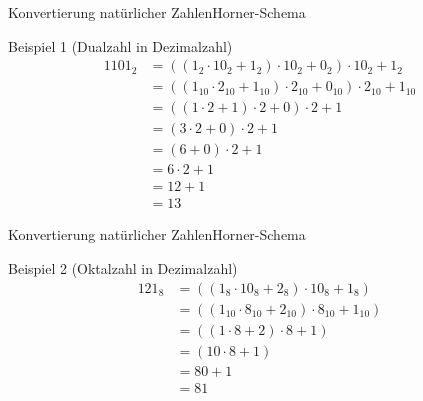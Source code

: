 \documentclass[xelatex,aspectratio=169]{beamer}
\begin{document}
\begin{frame}{Konvertierung natürlicher Zahlen}{Horner-Schema}
  \begin{exampleblock}{Beispiel 1 (Dualzahl in Dezimalzahl)}
    \begin{align*}
      1101_2 & = ((1_2 \cdot 10_2 + 1_2) \cdot 10_2 + 0_2) \cdot 10_2 + 1_2                   \\
             & = ((1_{10} \cdot 2_{10} + 1_{10}) \cdot 2_{10} + 0_{10}) \cdot 2_{10} + 1_{10} \\
             & = ((1 \cdot 2 + 1) \cdot 2 + 0) \cdot 2 + 1                                    \\
             & = (3 \cdot 2 + 0) \cdot 2 + 1                                                  \\
             & = (6 + 0) \cdot 2 + 1                                                          \\
             & = 6 \cdot 2 + 1                                                                \\
             & = 12 + 1                                                                       \\
             & = 13
    \end{align*}

  \end{exampleblock}
\end{frame}

\begin{frame}{Konvertierung natürlicher Zahlen}{Horner-Schema}
  \begin{exampleblock}{Beispiel 2 (Oktalzahl in Dezimalzahl)}
    \begin{align*}
      121_8 & = ((1_8 \cdot 10_8 + 2_8) \cdot 10_8 + 1_8)              \\
            & = ((1_{10} \cdot 8_{10} + 2_{10}) \cdot 8_{10} + 1_{10}) \\
            & = ((1 \cdot 8 + 2) \cdot 8 + 1)                          \\
            & = (10 \cdot 8 + 1)                                       \\
            & = 80 + 1                                                 \\
            & = 81
    \end{align*}
  \end{exampleblock}
\end{frame}
\end{document}
